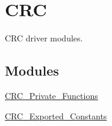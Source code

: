 \hypertarget{group___c_r_c}{}\section{C\+R\+C}
\label{group___c_r_c}


C\+R\+C driver modules.  


\subsection*{Modules}
\begin{DoxyCompactItemize}
\item 
\hyperlink{group___c_r_c___private___functions}{C\+R\+C\+\_\+\+Private\+\_\+\+Functions}
\item 
\hyperlink{group___c_r_c___exported___constants}{C\+R\+C\+\_\+\+Exported\+\_\+\+Constants}
\end{DoxyCompactItemize}

